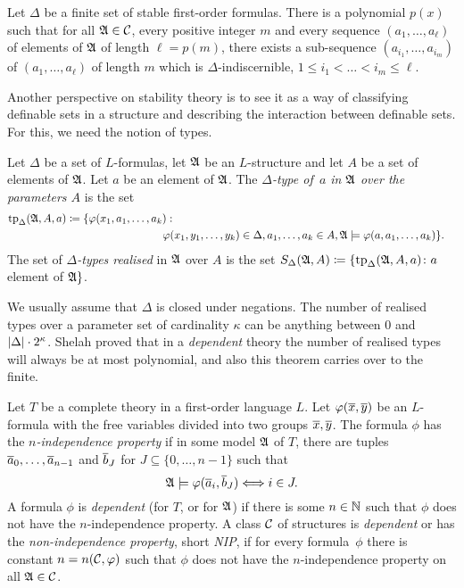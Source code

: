 \begin{theorem}\label{thm:malshelah}
  Let  $\Delta$ be a finite
  set of stable first-order formulas.  There is a polynomial $p(x)$ such that
  for all $\mathfrak{A}\in \mathcal{C}$, every positive integer $m$ and every sequence
  $(a_1,\ldots, a_\ell)$ of elements of $\mathfrak{A}$ of length $\ell=p(m)$, there
  exists a sub-sequence $(a_{i_1},\ldots, a_{i_m})$ of
  $(a_1,\ldots, a_\ell)$ of length $m$ which is
  $\Delta$-indiscernible, $1\leq i_1<\ldots <i_m\leq \ell$.
\end{theorem}

Another perspective on stability theory is to see it as a way of 
classifying definable sets in a structure and describing the interaction 
between definable sets. For this, we need the notion of types. 

\begin{definition}
Let $\Delta$ be a set of $L$-formulas, let $\mathfrak{A}$ be an $L$-structure and let
$A$ be a set of elements of $\mathfrak{A}$. Let $a$ be an element of $\mathfrak{A}$. The 
\emph{$\Delta$-type of~$a$ in $\mathfrak{A}$ over the parameters $A$} is the set
\begin{align*}
  \mathrm{tp}_\Delta(\strA, A, a) & \coloneqq  \{ \phi(x_1,a_1,\ldots, a_k)  : &\\
  &  \hspace{3.1cm}
                                \phi(x_1,y_1,\ldots, y_k)\in \Delta,
                                a_1,\ldots, a_k\in A,
                                \strA\models\phi(a,a_1,\ldots, a_k)\}.
\end{align*}
The set of \emph{$\Delta$-types realised} in $\mathfrak{A}$ over $A$ is the set
$S_\Delta(\mathfrak{A},A) \coloneqq \{ \mathrm{tp}_\Delta(\mathfrak{A}, A, a) \colon a$ element of $\mathfrak{A}\}$.
\end{definition}

We usually assume that $\Delta$ is closed under negations. 
The number of realised types over a parameter set of cardinality
$\kappa$ can be anything between $0$ and $\left\lvert\Delta\right\rvert\cdot 2^\kappa$. 
Shelah proved that
in a \emph{dependent} theory the number of realised types will always be
at most polynomial, and also this theorem carries over to the finite. 

\begin{definition}
Let $T$ be a complete theory in a first-order language $L$. Let 
$\varphi(\overline{x},\overline{y})$ be an $L$-formula with the free variables
divided into two groups $\overline{x}, \overline{y}$. The formula $\phi$ has
the \emph{$n$-independence property} if in some model $\mathfrak{A}$
of $T$, there are tuples $\overline{a}_0,\ldots, \overline{a}_{n-1}$ and
$\overline{b}_J$ for $J\subseteq \{0,\ldots, n-1\}$ such that
\[\mathfrak{A}\models\varphi(\overline{a}_i,\overline{b}_J)\Longleftrightarrow i\in J. \]
A formula $\phi$ is \emph{dependent} (for $T$, or for $\mathfrak{A}$) if there is 
some $n\in \mathbb{N}$ such that $\phi$ does not have the $n$-independence property. 
A class $\mathcal{C}$ of structures is \emph{dependent} or has the \emph{non-independence property}, 
short \emph{NIP}, if for every formula~$\phi$ there is constant $n=n(\mathcal{C},\varphi)$
such that $\phi$ does not have the $n$-independence property on all $\mathfrak{A}\in \mathcal{C}$.
\end{definition}


